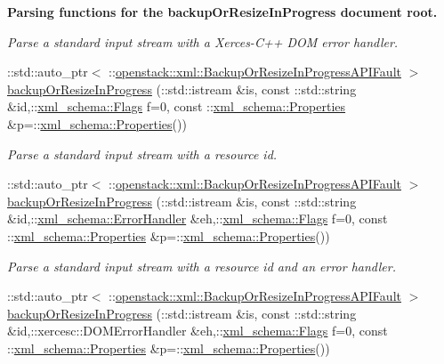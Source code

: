 \begin{Indent}{\bf Parsing functions for the backupOrResizeInProgress document root.}
\begin{DoxyCompactItemize}
\begin{DoxyCompactList}\small\item\em Parse a standard input stream with a Xerces-\/C++ DOM error handler. \item\end{DoxyCompactList}\item 
::std::auto\_\-ptr$<$ ::\hyperlink{classopenstack_1_1xml_1_1BackupOrResizeInProgressAPIFault}{openstack::xml::BackupOrResizeInProgressAPIFault} $>$ \hyperlink{namespaceopenstack_1_1xml_abc049037fad943692916c072245d8fb6}{backupOrResizeInProgress} (::std::istream \&is, const ::std::string \&id,::\hyperlink{namespacexml__schema_affb4c227cbd9aa7453dd1dc5a1401943}{xml\_\-schema::Flags} f=0, const ::\hyperlink{namespacexml__schema_ad27ce19a7ee1d3b1064092648898f64c}{xml\_\-schema::Properties} \&p=::\hyperlink{namespacexml__schema_ad27ce19a7ee1d3b1064092648898f64c}{xml\_\-schema::Properties}())
\begin{DoxyCompactList}\small\item\em Parse a standard input stream with a resource id. \item\end{DoxyCompactList}\item 
::std::auto\_\-ptr$<$ ::\hyperlink{classopenstack_1_1xml_1_1BackupOrResizeInProgressAPIFault}{openstack::xml::BackupOrResizeInProgressAPIFault} $>$ \hyperlink{namespaceopenstack_1_1xml_ae17968581161053c2296ffea70804498}{backupOrResizeInProgress} (::std::istream \&is, const ::std::string \&id,::\hyperlink{namespacexml__schema_ab1c9361bfd3b404eaabf0c31eded79dc}{xml\_\-schema::ErrorHandler} \&eh,::\hyperlink{namespacexml__schema_affb4c227cbd9aa7453dd1dc5a1401943}{xml\_\-schema::Flags} f=0, const ::\hyperlink{namespacexml__schema_ad27ce19a7ee1d3b1064092648898f64c}{xml\_\-schema::Properties} \&p=::\hyperlink{namespacexml__schema_ad27ce19a7ee1d3b1064092648898f64c}{xml\_\-schema::Properties}())
\begin{DoxyCompactList}\small\item\em Parse a standard input stream with a resource id and an error handler. \item\end{DoxyCompactList}\item 
::std::auto\_\-ptr$<$ ::\hyperlink{classopenstack_1_1xml_1_1BackupOrResizeInProgressAPIFault}{openstack::xml::BackupOrResizeInProgressAPIFault} $>$ \hyperlink{namespaceopenstack_1_1xml_acb4443d14252f20f4826648deaf061f4}{backupOrResizeInProgress} (::std::istream \&is, const ::std::string \&id,::xercesc::DOMErrorHandler \&eh,::\hyperlink{namespacexml__schema_affb4c227cbd9aa7453dd1dc5a1401943}{xml\_\-schema::Flags} f=0, const ::\hyperlink{namespacexml__schema_ad27ce19a7ee1d3b1064092648898f64c}{xml\_\-schema::Properties} \&p=::\hyperlink{namespacexml__schema_ad27ce19a7ee1d3b1064092648898f64c}{xml\_\-schema::Properties}())

\end{DoxyCompactItemize}
\end{Indent}
